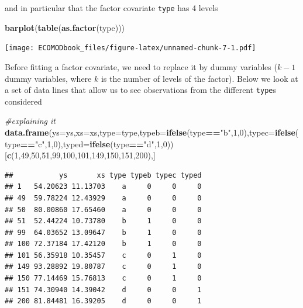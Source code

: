 \documentclass[
]{book}
\newenvironment{Shaded}{\begin{snugshade}}{\end{snugshade}}
\newcommand{\AttributeTok}[1]{\textcolor[rgb]{0.13,0.29,0.53}{#1}}
\newcommand{\CommentTok}[1]{\textcolor[rgb]{0.56,0.35,0.01}{\textit{#1}}}
\newcommand{\DecValTok}[1]{\textcolor[rgb]{0.00,0.00,0.81}{#1}}
\newcommand{\FunctionTok}[1]{\textcolor[rgb]{0.13,0.29,0.53}{\textbf{#1}}}
\newcommand{\NormalTok}[1]{#1}
\newcommand{\SpecialCharTok}[1]{\textcolor[rgb]{0.81,0.36,0.00}{\textbf{#1}}}
\newcommand{\StringTok}[1]{\textcolor[rgb]{0.31,0.60,0.02}{#1}}
\begin{document}
and in particular that the factor covariate \texttt{type} has 4 levels

\begin{Shaded}
\begin{Highlighting}[]
\FunctionTok{barplot}\NormalTok{(}\FunctionTok{table}\NormalTok{(}\FunctionTok{as.factor}\NormalTok{(type)))}
\end{Highlighting}
\end{Shaded}

\texttt{[image: ECOMODbook\_files/figure-latex/unnamed-chunk-7-1.pdf]}

Before fitting a factor covariate, we need to replace it by dummy variables (\(k-1\) dummy variables, where \(k\) is the number of levels of the factor). Below we look at a set of data lines that allow us to see observations from the different \texttt{type}s considered

\begin{Shaded}
\begin{Highlighting}[]
\CommentTok{\#explaining it}
\FunctionTok{data.frame}\NormalTok{(}\AttributeTok{ys=}\NormalTok{ys,}\AttributeTok{xs=}\NormalTok{xs,}\AttributeTok{type=}\NormalTok{type,}\AttributeTok{typeb=}\FunctionTok{ifelse}\NormalTok{(type}\SpecialCharTok{==}\StringTok{"b"}\NormalTok{,}\DecValTok{1}\NormalTok{,}\DecValTok{0}\NormalTok{),}\AttributeTok{typec=}\FunctionTok{ifelse}\NormalTok{(type}\SpecialCharTok{==}\StringTok{"c"}\NormalTok{,}\DecValTok{1}\NormalTok{,}\DecValTok{0}\NormalTok{),}\AttributeTok{typed=}\FunctionTok{ifelse}\NormalTok{(type}\SpecialCharTok{==}\StringTok{"d"}\NormalTok{,}\DecValTok{1}\NormalTok{,}\DecValTok{0}\NormalTok{))[}\FunctionTok{c}\NormalTok{(}\DecValTok{1}\NormalTok{,}\DecValTok{49}\NormalTok{,}\DecValTok{50}\NormalTok{,}\DecValTok{51}\NormalTok{,}\DecValTok{99}\NormalTok{,}\DecValTok{100}\NormalTok{,}\DecValTok{101}\NormalTok{,}\DecValTok{149}\NormalTok{,}\DecValTok{150}\NormalTok{,}\DecValTok{151}\NormalTok{,}\DecValTok{200}\NormalTok{),]}
\end{Highlighting}
\end{Shaded}

\begin{verbatim}
##           ys       xs type typeb typec typed
## 1   54.20623 11.13703    a     0     0     0
## 49  59.78224 12.43929    a     0     0     0
## 50  80.00860 17.65460    a     0     0     0
## 51  52.44224 10.73780    b     1     0     0
## 99  64.03652 13.09647    b     1     0     0
## 100 72.37184 17.42120    b     1     0     0
## 101 56.35918 10.35457    c     0     1     0
## 149 93.28892 19.80787    c     0     1     0
## 150 77.14469 15.76813    c     0     1     0
## 151 74.30940 14.39042    d     0     0     1
## 200 81.84481 16.39205    d     0     0     1
\end{verbatim}
\end{document}
